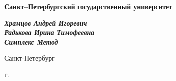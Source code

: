 \begin{titlepage}
\begin{center}

\textbf{Санкт--Петербургский}
\textbf{государственный университет}

\vspace{35mm}

\textbf{\textit{\large Храмцов Андрей Игоревич}} \\
\textbf{\textit{\large Радькова Ирина Тимофеевна}} \\[8mm]
\textbf{\textit{\large Симплекс Метод}}

\vspace{20mm}

\begin{flushright}
\begin{minipage}[t]{0.65\textwidth}

\end{minipage}
\end{flushright}

\vfill 

{Санкт-Петербург}
\par{\the\year{} г.}
\end{center}
\end{titlepage}
\restoregeometry
\addtocounter{page}{1}
